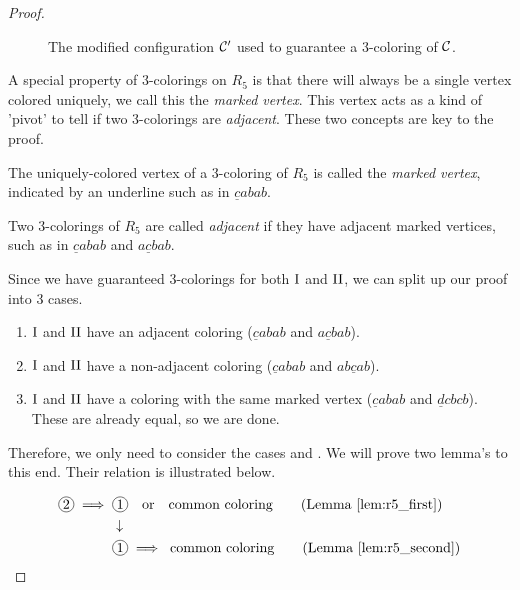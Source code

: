 \begin{proof}
\begin{figure}
    \caption{The modified configuration $\mathcal{C}'$ used to guarantee a 3-coloring of $\mathcal{C}$.}
    \label{fig:confg3col}
\end{figure}


A special property of 3-colorings on $R_5$ is that there will always be a single vertex colored uniquely, we call this the \textit{marked vertex}. This vertex acts as a kind of 'pivot' to tell if two 3-colorings are \textit{adjacent}. These two concepts are key to the proof.

\begin{definition}
    The uniquely-colored vertex of a 3-coloring of $R_5$ is called the \emph{marked vertex}, indicated by an underline such as in $\underline{c}abab$.
\end{definition}
\begin{definition}
    Two 3-colorings of $R_5$ are called \emph{adjacent} if they have adjacent marked vertices, such as in $\underline{c}abab$ and $a\underline{c}bab$.
\end{definition}

Since we have guaranteed 3-colorings for both $\text{I}$ and $\text{II}$, we can split up our proof into 3 cases.

\begin{enumerate}
    \item $\text{I}$ and $\text{II}$ have an adjacent coloring ($\underline{c}abab$ and $a\underline{c}bab$).
    \item $\text{I}$ and $\text{II}$ have a non-adjacent coloring ($\underline{c}abab$ and $ab\underline{c}ab$).
    \item $\text{I}$ and $\text{II}$ have a coloring with the same marked vertex ($\underline{c}abab$ and $\underline{d}cbcb$). These are already equal, so we are done.
\end{enumerate}

Therefore, we only need to consider the cases  and . We will prove two lemma's to this end. Their relation is illustrated below.

\begin{equation*}
    \begin{aligned}
    \circled{2} \implies\; &\circled{1}\quad \text{or} \quad \text{common coloring} \quad\quad \text{(Lemma \ref{lem:r5_first})} \\
    &\downarrow \\
    &\circled{1} \implies\;\text{common coloring}\quad\quad \text{(Lemma \ref{lem:r5_second})}
    \end{aligned}
\end{equation*}


\end{proof}
